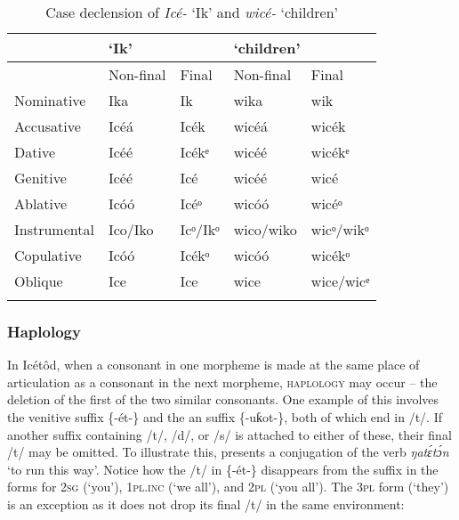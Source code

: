 \begin{table}
\caption{Case declension of \textit{Icé-} ‘Ik’ and \textit{wicé-} ‘children’}
\label{tab:phon:wice}


\begin{tabularx}{\textwidth}{XXXXX}
\lsptoprule

& \multicolumn{2}{X}{‘Ik’} & \multicolumn{2}{X}{‘children’}\\
\midrule
& Non-final & Final & Non-final & Final\\
\midrule
Nominative & Ika & Ik\ᵃ & wika & wik\ᵃ\\
Accusative & Icéá & Icék\ᵃ & wicéá & wicék\ᵃ\\
Dative & Icéé & Icékᵉ & wicéé & wicékᵉ\\
Genitive & Icéé & Icé & wicéé & wicé\\
Ablative & Icóó & Icéᵒ & wicóó & wicéᵒ\\
Instrumental & Ico/Iko & Icᵒ/Ikᵒ & wico/wiko & wicᵒ/wikᵒ\\
Copulative & Icóó & Icékᵒ & wicóó & wicékᵒ\\
Oblique & Ice & Ice & wice & wice/wicᵉ\\
\lspbottomrule
\end{tabularx}
\end{table}


\subsubsection{Haplology}\label{sec:2.4.2}

In Icétôd, when a consonant in one morpheme is made at the same place of articulation as a consonant in the next morpheme, \textsc{haplology} may occur – the deletion of the first of the two similar consonants. One example of this involves the venitive suffix \{-ét-\} and the an suffix \{-uƙot-\}, both of which end in /t/. If another suffix containing /t/, /d/, or /s/ is attached to either of these, their final /t/ may be omitted. To illustrate this,  presents a conjugation of the verb \textit{ŋat\'{ɛ}t\'{ɔ}n} ‘to run this way’. Notice how the /t/ in \{-ét-\} disappears from the suffix in the forms for \textsc{2sg} (‘you’), \textsc{1pl.inc} (‘we all’), and \textsc{2pl} (‘you all’). The 3\textsc{pl} form (‘they’) is an exception as it does not drop its final /t/ in the same environment:


